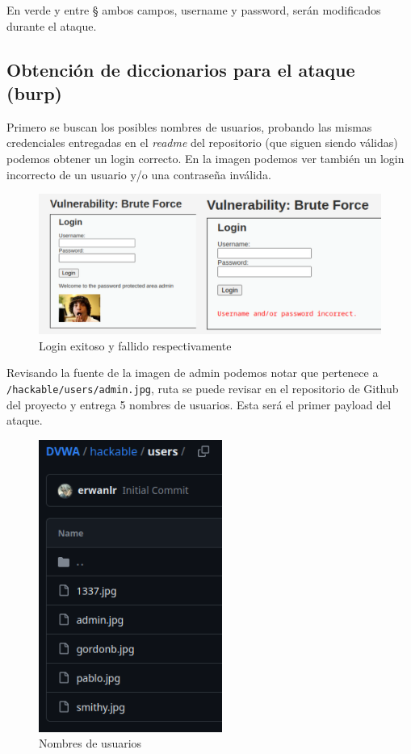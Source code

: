 \documentclass[letter,12pt]{article}
\newcommand{\code}[1]{\colorbox{lightgray!80}{\lstinline[breaklines=true]|#1|}}
\begin{document}
En verde y entre § ambos campos, username y password, serán modificados durante
el ataque.

\subsection{Obtención de diccionarios para el ataque (burp)}
Primero se buscan los posibles nombres de usuarios, probando las mismas
credenciales entregadas en el \textit{readme} del repositorio (que siguen siendo
válidas) podemos obtener un login correcto. En la imagen podemos ver también un
login incorrecto de un usuario y/o una contraseña inválida.
\begin{figure}[H]
  \centering
  \includegraphics[width=16cm]{images/06-login.png}
  \caption{Login exitoso y fallido respectivamente}
\end{figure}

Revisando la fuente de la imagen de admin podemos notar que pertenece a \\
\code{/hackable/users/admin.jpg}, ruta se puede revisar en el repositorio de
Github del proyecto y entrega 5 nombres de usuarios. Esta será el primer payload
del ataque.

\begin{figure}[H]
  \centering
  \includegraphics[width=6cm]{images/07-users.png}
  \caption{Nombres de usuarios}
\end{figure}
\end{document}
